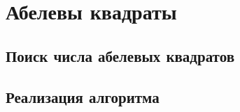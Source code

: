 \section{Абелевы квадраты}
\subsection{Поиск числа абелевых квадратов}

\subsection{Реализация алгоритма}

